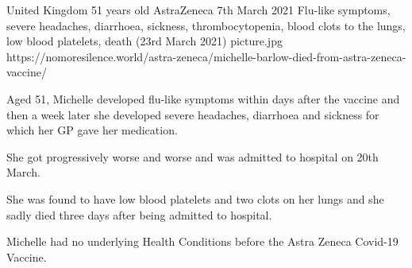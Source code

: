 {United Kingdom}
{51 years old}
{AstraZeneca}
{7th March 2021}
{Flu-like symptoms, severe headaches, diarrhoea, sickness, thrombocytopenia,
  blood clots to the lungs, low blood platelets, death (23rd March 2021)}
{picture.jpg}
{https://nomoresilence.world/astra-zeneca/michelle-barlow-died-from-astra-zeneca-vaccine/}
{

Aged 51, Michelle developed flu-like symptoms within days after the vaccine and
then a week later she developed severe headaches, diarrhoea and sickness for
which her GP gave her medication.

She got progressively worse and worse and was admitted to hospital on 20th
March.

She was found to have low blood platelets and two clots on her lungs and she
sadly died three days after being admitted to hospital.

Michelle had no underlying Health Conditions before the Astra Zeneca Covid-19
Vaccine.

}
